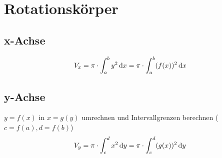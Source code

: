 \section{Rotationskörper}
\subsection{x-Achse}
\begin{equation*}
	V_x = \pi \cdot \int_{a}^{b} y^2 \,\mathrm dx = \pi \cdot \int_{a}^{b} (f(x))^2 \,\mathrm dx
\end{equation*}

\subsection{y-Achse}
$y = f(x)$ in $x = g(y)$ umrechnen und Intervallgrenzen berechnen ($c = f(a), d = f(b)$)
\begin{equation*}
	V_y = \pi \cdot \int_{c}^{d} x^2 \,\mathrm dy = \pi \cdot \int_{c}^{d} (g(x))^2 \,\mathrm dy 
\end{equation*}
